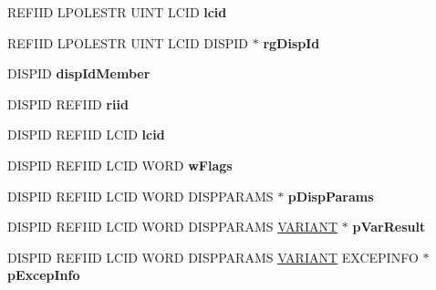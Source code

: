 \begin{DoxyCompactItemize}
\item 
\mbox{\label{struct_i_ms_tsc_ax_vtbl_af318bb69d6fa3d62bee501ff59d2cf03}} 
R\+E\+F\+I\+ID L\+P\+O\+L\+E\+S\+TR U\+I\+NT L\+C\+ID {\bfseries lcid}
\item 
\mbox{\label{struct_i_ms_tsc_ax_vtbl_ac69b8e3ab8c7e95d48cbc304a2c7060a}} 
R\+E\+F\+I\+ID L\+P\+O\+L\+E\+S\+TR U\+I\+NT L\+C\+ID D\+I\+S\+P\+ID $\ast$ {\bfseries rg\+Disp\+Id}
\item 
\mbox{\label{struct_i_ms_tsc_ax_vtbl_aeaabd85c11257c5c43a6bd4de14a9659}} 
D\+I\+S\+P\+ID {\bfseries disp\+Id\+Member}
\item 
\mbox{\label{struct_i_ms_tsc_ax_vtbl_a52f9d5cf8a20edb21980cdb12ed524fa}} 
D\+I\+S\+P\+ID R\+E\+F\+I\+ID {\bfseries riid}
\item 
\mbox{\label{struct_i_ms_tsc_ax_vtbl_a2e93db505ed3f94e3f0de33f9214a617}} 
D\+I\+S\+P\+ID R\+E\+F\+I\+ID L\+C\+ID {\bfseries lcid}
\item 
\mbox{\label{struct_i_ms_tsc_ax_vtbl_a36b1cc2e856f58834c0015946923992e}} 
D\+I\+S\+P\+ID R\+E\+F\+I\+ID L\+C\+ID W\+O\+RD {\bfseries w\+Flags}
\item 
\mbox{\label{struct_i_ms_tsc_ax_vtbl_a36b960b3f2d331199462fd418b743118}} 
D\+I\+S\+P\+ID R\+E\+F\+I\+ID L\+C\+ID W\+O\+RD D\+I\+S\+P\+P\+A\+R\+A\+MS $\ast$ {\bfseries p\+Disp\+Params}
\item 
\mbox{\label{struct_i_ms_tsc_ax_vtbl_a4d26987f4f7f8404eacd6c44e114133c}} 
D\+I\+S\+P\+ID R\+E\+F\+I\+ID L\+C\+ID W\+O\+RD D\+I\+S\+P\+P\+A\+R\+A\+MS \hyperlink{structtag_v_a_r_i_a_n_t}{V\+A\+R\+I\+A\+NT} $\ast$ {\bfseries p\+Var\+Result}
\item 
\mbox{\label{struct_i_ms_tsc_ax_vtbl_ab78e5c44721bc0080c66ca3f0cb65932}} 
D\+I\+S\+P\+ID R\+E\+F\+I\+ID L\+C\+ID W\+O\+RD D\+I\+S\+P\+P\+A\+R\+A\+MS \hyperlink{structtag_v_a_r_i_a_n_t}{V\+A\+R\+I\+A\+NT} E\+X\+C\+E\+P\+I\+N\+FO $\ast$ {\bfseries p\+Excep\+Info}
\item 

\end{DoxyCompactItemize}

